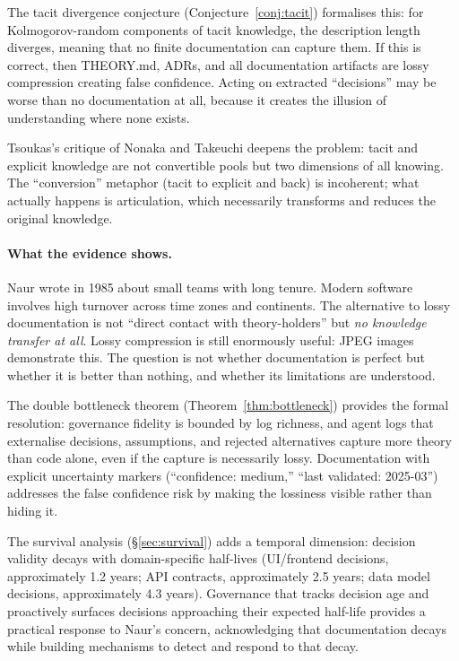 \documentclass[11pt, a4paper, logo, copyright]{googledeepmind}
\begin{document}
The tacit divergence conjecture (Conjecture~\ref{conj:tacit}) formalises this: for Kolmogorov-random components of tacit knowledge, the description length diverges, meaning that no finite documentation can capture them. If this is correct, then THEORY.md, ADRs, and all documentation artifacts are lossy compression creating false confidence. Acting on extracted ``decisions'' may be worse than no documentation at all, because it creates the illusion of understanding where none exists.

Tsoukas's critique of Nonaka and Takeuchi deepens the problem: tacit and explicit knowledge are not convertible pools but two dimensions of all knowing. The ``conversion'' metaphor (tacit to explicit and back) is incoherent; what actually happens is articulation, which necessarily transforms and reduces the original knowledge.

\paragraph{What the evidence shows.}
Naur wrote in 1985 about small teams with long tenure. Modern software involves high turnover across time zones and continents. The alternative to lossy documentation is not ``direct contact with theory-holders'' but \emph{no knowledge transfer at all}. Lossy compression is still enormously useful: JPEG images demonstrate this. The question is not whether documentation is perfect but whether it is better than nothing, and whether its limitations are understood.

The double bottleneck theorem (Theorem~\ref{thm:bottleneck}) provides the formal resolution: governance fidelity is bounded by log richness, and agent logs that externalise decisions, assumptions, and rejected alternatives capture more theory than code alone, even if the capture is necessarily lossy. Documentation with explicit uncertainty markers (``confidence: medium,'' ``last validated: 2025-03'') addresses the false confidence risk by making the lossiness visible rather than hiding it.

The survival analysis (\S\ref{sec:survival}) adds a temporal dimension: decision validity decays with domain-specific half-lives (UI/frontend decisions, approximately 1.2 years; API contracts, approximately 2.5 years; data model decisions, approximately 4.3 years). Governance that tracks decision age and proactively surfaces decisions approaching their expected half-life provides a practical response to Naur's concern, acknowledging that documentation decays while building mechanisms to detect and respond to that decay.
\end{document}
